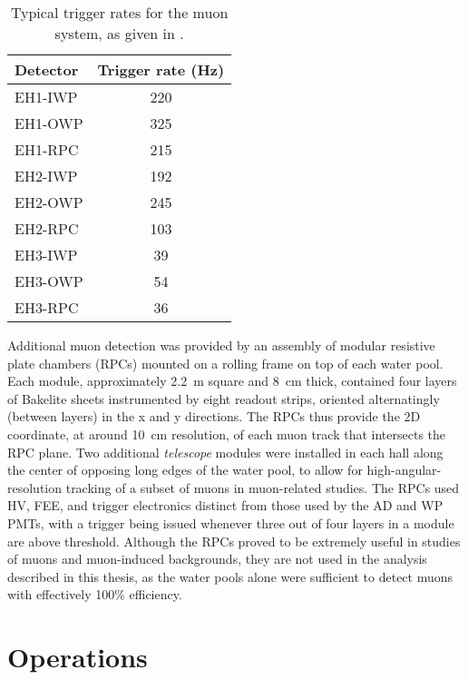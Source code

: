 \documentclass[../thesis.tex]{subfiles}
\begin{document}
\begin{table}[h]
  \begin{tabular}{lc}
    \toprule
    Detector & Trigger rate (Hz) \\
    \midrule
    EH1-IWP & 220 \\
    EH1-OWP & 325 \\
    EH1-RPC & 215 \\
    \midrule
    EH2-IWP & 192 \\
    EH2-OWP & 245 \\
    EH2-RPC & 103 \\
    \midrule
    EH3-IWP & 39 \\
    EH3-OWP & 54 \\
    EH3-RPC & 36 \\
    \bottomrule
  \end{tabular}
  \caption{Typical trigger rates for the muon system, as given in \cite{AN2016133}.}
  \label{tab:wpTriggerRates}
\end{table}

Additional muon detection was provided by an assembly of modular resistive plate chambers (RPCs) mounted on a rolling frame on top of each water pool. Each module, approximately 2.2~m square and 8~cm thick, contained four layers of Bakelite sheets instrumented by eight readout strips, oriented alternatingly (between layers) in the x and y directions. The RPCs thus provide the 2D coordinate, at around 10~cm resolution, of each muon track that intersects the RPC plane. Two additional \emph{telescope} modules were installed in each hall along the center of opposing long edges of the water pool, to allow for high-angular-resolution tracking of a subset of muons in muon-related studies. The RPCs used HV, FEE, and trigger electronics distinct from those used by the AD and WP PMTs, with a trigger being issued whenever three out of four layers in a module are above threshold. Although the RPCs proved to be extremely useful in studies of muons and muon-induced backgrounds, they are not used in the analysis described in this thesis, as the water pools alone were sufficient to detect muons with effectively 100\% efficiency.

\section{Operations}
\label{sec:expOperations}
\end{document}
